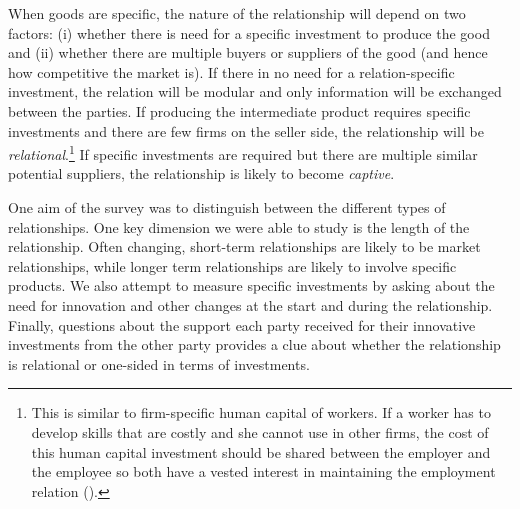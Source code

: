 \documentclass[final, dvipsnames, authoryear,12pt]{elsarticle}
\begin{document}
When goods are specific, the nature of the relationship will depend on two factors: (i) whether there is need for a specific investment to produce the good and (ii) whether there are multiple buyers or suppliers of the good (and hence how competitive the market is). If there in no need for a relation-specific investment, the relation will be modular and only information will be exchanged between the parties. If producing the intermediate product requires specific investments and there are few firms on the seller side, the relationship will be \textit{relational}.\footnote{This is similar to firm-specific human capital of workers. If a worker has to develop skills that are costly and she cannot use in other firms, the cost of this human capital investment should be shared between the employer and the employee so both have a vested interest in maintaining the employment relation (\cite{becker1962investment}).} If specific investments are required but there are multiple similar potential suppliers, the relationship is likely to become \textit{captive}.

One aim of the survey was to distinguish between the different types of relationships. One key dimension we were able to study is the length of the relationship. Often changing, short-term relationships are likely to be market relationships, while longer term relationships are likely to involve specific products. We also attempt to measure specific investments by asking about the need for innovation and other changes at the start and during the relationship. Finally, questions about the support each party received for their innovative investments from the other party provides a clue about whether the relationship is relational or one-sided in terms of investments. 

    


\end{document}
